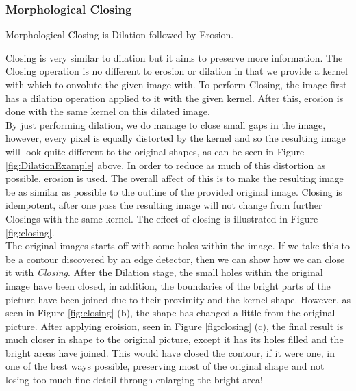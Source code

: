 \documentclass[11pt]{article}
\begin{document}
\subsubsection{Morphological Closing}
\label{sec:morphologicalclosing}
\begin{center}
Morphological Closing is Dilation followed by Erosion.
\end{center}
Closing is very similar to dilation but it aims to preserve more information.
The Closing operation is no different to erosion or dilation in that we
provide a kernel with which to onvolute the given image with. To perform Closing,
the image first has a dilation operation applied to it with the given kernel. 
After this, erosion is done with the same kernel on this dilated image. \\
By just performing dilation, we do manage to close small gaps in the image, 
however, every pixel is equally distorted by the kernel and so the resulting
image will look quite different to the original shapes, as can be seen
in Figure \ref{fig:DilationExample} above. In order to reduce as much
of this distortion as possible, erosion is used. The overall affect of this is
to make the resulting image be as similar as possible to the outline of the
provided original image. Closing is idempotent, after one pass the resulting
image will not change from further Closings with the same kernel. The effect 
of closing is illustrated in Figure \ref{fig:closing}.\\
The original images starts off with some holes within the image. If we
take this to be a contour discovered by an edge detector, then we can show
how we can close it with \textit{Closing}. After the Dilation stage, the
small holes within the original image have been closed, in addition, the 
boundaries of the bright parts of the picture have been joined due to their
proximity and the kernel shape. However, as seen in Figure \ref{fig:closing} (b),
the shape has changed a little from the original picture. After applying
eroision, seen in Figure \ref{fig:closing} (c), the final result is much closer
in shape to the original picture, except it has its holes filled and the 
bright areas have joined. This would have closed the contour, if it were one,
in one of the best ways possible, preserving most of the original shape and not
losing too much fine detail through enlarging the bright area!
\end{document}
